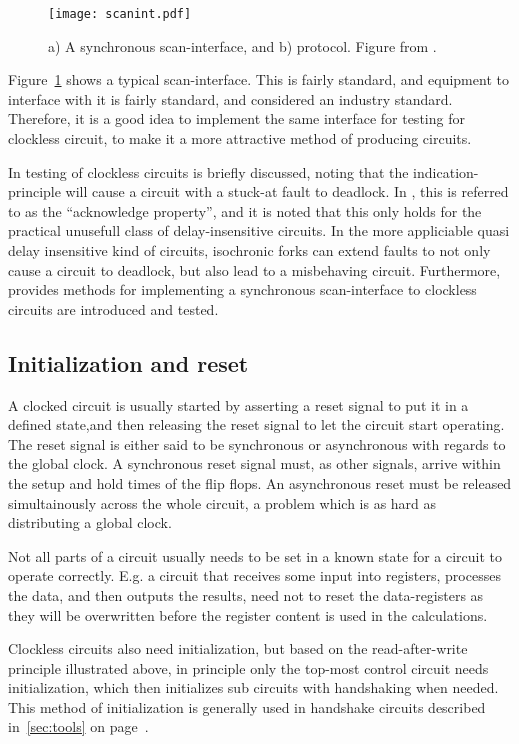 \begin{figure}[htbp]
  \centering
  \texttt{[image: scanint.pdf]}
  \caption{a) A synchronous scan-interface, and b) protocol. Figure
    from \cite[pp. 11]{fullscan}.}
  \label{fig:scanint}
\end{figure}

Figure~\ref{fig:scanint} shows a typical scan-interface. This is
fairly standard, and equipment to interface with it is fairly
standard, and considered an industry standard. Therefore, it is
a good idea to implement the same interface for testing for clockless
circuit, to make it a more attractive method of producing circuits.

In \cite[pp. 27-28]{sparso} testing of clockless circuits is briefly
discussed, noting that the indication-principle will cause a circuit
with a stuck-at fault to deadlock. In \cite[pp. 26]{fullscan}, this is
referred to as the ``acknowledge property'', and it is noted that this
only holds for the practical unusefull class of delay-insensitive
circuits. In the more appliciable quasi delay insensitive kind of
circuits, isochronic forks can extend faults to not only cause a
circuit to deadlock, but also lead to a misbehaving circuit.
Furthermore, \cite{fullscan} provides methods for implementing a
synchronous scan-interface to clockless circuits are introduced and
tested.

\subsection{Initialization and reset}

A clocked circuit is usually started by asserting a reset signal to
put it in a defined state,and then releasing the reset signal to let
the circuit start operating. The reset signal is either said to be
synchronous or asynchronous with regards to the global clock. A
synchronous reset signal must, as other signals, arrive within the
setup and hold times of the flip flops. An asynchronous reset must be
released simultainously across the whole circuit, a problem which is
as hard as distributing a global clock.

Not all parts of a circuit usually needs to be set in a known state
for a circuit to operate correctly. E.g. a circuit that receives some
input into registers, processes the data, and then outputs the
results, need not to reset the data-registers as they will be
overwritten before the register content is used in the calculations.

Clockless circuits also need initialization, but based on the
read-after-write principle illustrated above, in principle only the
top-most control circuit needs initialization, which then initializes
sub circuits with handshaking when needed. This method of
initialization is generally used in handshake circuits described
in~\ref{sec:tools} on page~\pageref{par:init}.

